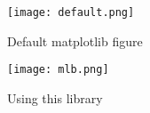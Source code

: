 \documentclass[letterpaper, 10pt, twocolumn]{article}
\begin{document}
\lipsum[1][1-4]

\begin{figure}[hp]
\centering
\texttt{[image: default.png]}
\caption{Default matplotlib figure}
\end{figure}

\lipsum[1][5-20]

\newpage

\lipsum[1][1-4]

\begin{figure}[hp]
\centering
\texttt{[image: mlb.png]}
\caption{Using this library}
\end{figure}

\lipsum[1][5-20]
\end{document}
